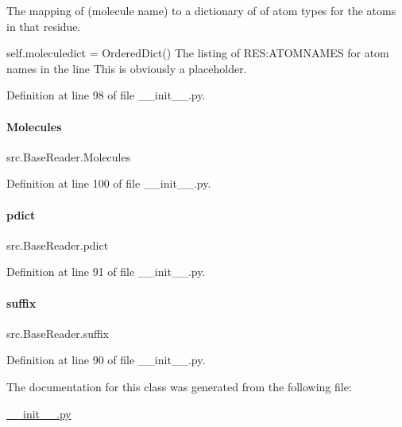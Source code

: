 The mapping of (molecule name) to a dictionary of of atom types for the atoms in that residue. 

self.\+moleculedict = Ordered\+Dict() The listing of \textquotesingle{}R\+ES\+:A\+T\+O\+M\+N\+A\+M\+ES\textquotesingle{} for atom names in the line This is obviously a placeholder. 

Definition at line 98 of file \+\_\+\+\_\+init\+\_\+\+\_\+.\+py.

\mbox{\label{classsrc_1_1BaseReader_a86945517a0969c7a099c9aec850b9762}} 
\paragraph{\texorpdfstring{Molecules}{Molecules}}
{\footnotesize\ttfamily src.\+Base\+Reader.\+Molecules}



Definition at line 100 of file \+\_\+\+\_\+init\+\_\+\+\_\+.\+py.

\mbox{\label{classsrc_1_1BaseReader_ac9cfd59b917771c7234cb36dd4c34048}} 
\paragraph{\texorpdfstring{pdict}{pdict}}
{\footnotesize\ttfamily src.\+Base\+Reader.\+pdict}



Definition at line 91 of file \+\_\+\+\_\+init\+\_\+\+\_\+.\+py.

\mbox{\label{classsrc_1_1BaseReader_a424d95bfd19d90f0fb8e1ba228d3583b}} 
\paragraph{\texorpdfstring{suffix}{suffix}}
{\footnotesize\ttfamily src.\+Base\+Reader.\+suffix}



Definition at line 90 of file \+\_\+\+\_\+init\+\_\+\+\_\+.\+py.



The documentation for this class was generated from the following file\+:\begin{DoxyCompactItemize}
\item 
\hyperlink{____init_____8py}{\+\_\+\+\_\+init\+\_\+\+\_\+.\+py}\end{DoxyCompactItemize}
